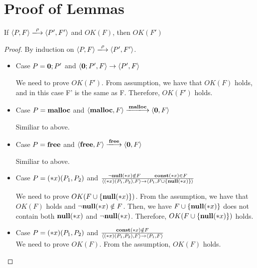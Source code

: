 \section{Proof of Lemmas}
\label{sec:proof}

\begin{lemma}
\label{lem:okFpreserved}
If \( \langle P, F \rangle \xlongrightarrow{\rho} \langle P', F' \rangle\) and \( OK(F)\), then \(OK(F')\)
\end{lemma}

\begin{proof}
By induction on \( \langle P, F \rangle \xlongrightarrow{\rho} \langle P', F' \rangle\).
  \begin{itemize}

  \item Case \( P = {\bf 0};P'\) and \( \langle {\bf 0};P', F \rangle \rightarrow \langle P', F \rangle \)
    
      We need to prove \(OK(F')\). From assumption, we have that
      \(OK(F)\) holds, and in this case F' is the same as
      F. Therefore, \(OK(F')\) holds.

    \item Case \( P = \mathbf{malloc}\) and \( \langle \Malloc, F \rangle \xlongrightarrow{\Malloc} \langle {\bf 0}, F \rangle \) 

      Similiar to above.

    \item Case \( P = \mathbf{free}\) and \( \langle \Free, F \rangle \xlongrightarrow{\Free} \langle {\bf 0}, F \rangle \)

      Similiar to above.

    \item Case \( P = (*x)(P_1,P_2)\) and \( \frac{\neg{\bf null}(*x) \notin F
      \quad\quad \mathbf{const}(*x) \in F} { \langle (*x)(P_1, P_2), F \rangle
      \rightarrow \langle P_1, F\cup \{{\bf null}(*x) \} \rangle } \)
      
      We need to prove \( OK(F\cup\{ {\bf null}(*x)\})\). From the assumption,
      we have that \(OK(F)\) holds and \( \neg{\bf null}(*x) \notin F\). Then, we
      have \(F\cup\{ {\bf null}(*x)\}\) does not contain both \({\bf null}(*x)\) and
      \( \neg{\bf null}(*x)\). Therefore, \( OK(F\cup\{ {\bf null}(*x)\})\) holds.

    \item Case \( P = (*x)(P_1,P_2)\) and \( \frac{\mathbf{const}(*x) \notin F}
      { \langle (*x)(P_1, P_2), F \rangle
      \rightarrow \langle P_1, F \rangle } \) \\
      We need to prove \( OK(F)\). From the assumption, \(OK(F)\) holds.


\end{itemize}
\end{proof}
